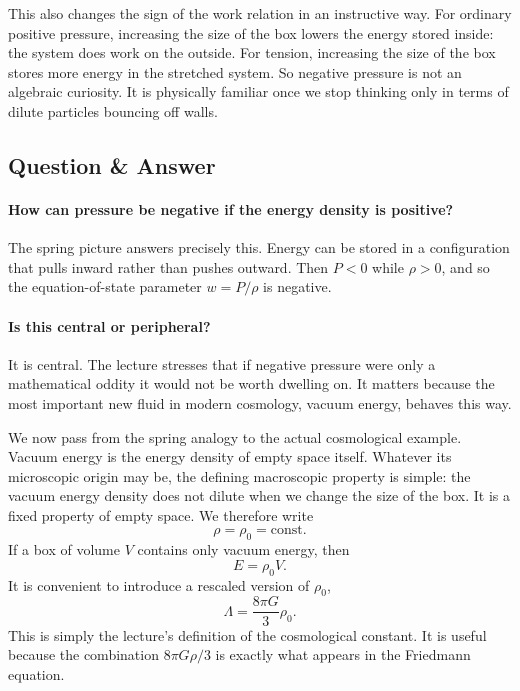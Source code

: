 This also changes the sign of the work relation in an instructive way. For ordinary positive pressure, increasing the size of the box lowers the energy stored inside: the system does work on the outside. For tension, increasing the size of the box stores more energy in the stretched system. So negative pressure is not an algebraic curiosity. It is physically familiar once we stop thinking only in terms of dilute particles bouncing off walls.

\subsection{Question \& Answer}

\paragraph{How can pressure be negative if the energy density is positive?} The spring picture answers precisely this. Energy can be stored in a configuration that pulls inward rather than pushes outward. Then \(P<0\) while \(\rho>0\), and so the equation-of-state parameter \(w=P/\rho\) is negative.

\paragraph{Is this central or peripheral?} It is central. The lecture stresses that if negative pressure were only a mathematical oddity it would not be worth dwelling on. It matters because the most important new fluid in modern cosmology, vacuum energy, behaves this way.

We now pass from the spring analogy to the actual cosmological example. Vacuum energy is the energy density of empty space itself. Whatever its microscopic origin may be, the defining macroscopic property is simple: the vacuum energy density does not dilute when we change the size of the box. It is a fixed property of empty space. We therefore write
\begin{equation}
\rho=\rho_0=\text{const.}
\end{equation}
If a box of volume \(V\) contains only vacuum energy, then
\begin{equation}
E=\rho_0 V.
\end{equation}
It is convenient to introduce a rescaled version of \(\rho_0\),
\begin{equation}
\Lambda=\frac{8\pi G}{3}\rho_0.
\end{equation}
This is simply the lecture's definition of the cosmological constant. It is useful because the combination \(8\pi G\rho/3\) is exactly what appears in the Friedmann equation.

